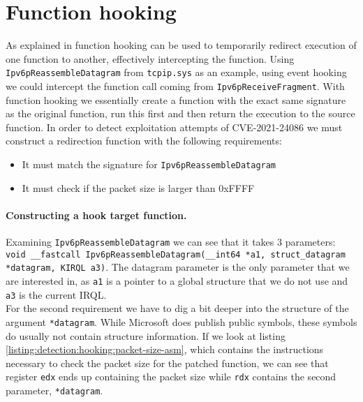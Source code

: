 \documentclass{report}
\begin{document}
\section{Function hooking}
\label{sec:detection:function-hooking}

As explained in  function hooking can be used to temporarily redirect execution of one function to another, effectively intercepting the function. Using \texttt{Ipv6pReassembleDatagram} from \texttt{tcpip.sys} as an example, using event hooking we could intercept the function call coming from \texttt{Ipv6pReceiveFragment}. With function hooking we essentially create a function with the exact same signature as the original function, run this first and then return the execution to the source function. In order to detect exploitation attempts of CVE-2021-24086 we must construct a redirection function with the following requirements:

\begin{itemize}
    \item It must match the signature for \texttt{Ipv6pReassembleDatagram}
    \item It must check if the packet size is larger than 0xFFFF
\end{itemize} 

\paragraph{Constructing a hook target function.}
Examining \texttt{Ipv6pReassembleDatagram} we can see that it takes 3 parameters: \texttt{void __fastcall Ipv6pReassembleDatagram(__int64 *a1, struct_datagram *datagram, KIRQL a3)}. The datagram parameter is the only parameter that we are interested in, as \texttt{a1} is a pointer to a global structure that we do not use and \texttt{a3} is the current IRQL\cite{url:kernel:irql}.
\\
For the second requirement we have to dig a bit deeper into the structure of the argument \texttt{*datagram}. While Microsoft does publish public symbols, these symbols do usually not contain structure information. If we look at listing \ref{listing:detection:hooking:packet-size-asm}, which contains the instructions necessary to check the packet size for the patched function, we can see that register \texttt{edx} ends up containing the packet size while \texttt{rdx} contains the second parameter, \texttt{*datagram}.
\end{document}
